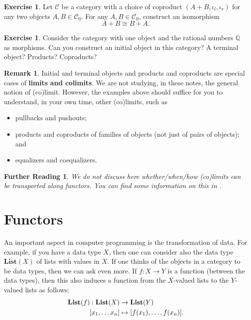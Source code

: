 \documentclass[a4paper,10pt]{scrartcl}
\theoremstyle{plain}
\newtheorem*{reading*}{Further Reading}
\theoremstyle{definition}
\newtheorem{rem}[thm]{Remark}
\newtheorem{exer}[thm]{Exercise}
\newcommand{\Cat}[1]{\mathcal{#1}}
\newcommand{\CC}{\Cat{C}}
\newcommand{\Catb}[1]{\mathbf{#1}}
\newcommand{\List}{\Catb{List}}
\newcommand{\Ob}[1]{{#1}_0}
\newcommand{\inl}{\ensuremath{\iota_l}}
\newcommand{\inr}{\ensuremath{\iota_r}}
\begin{document}
\begin{exer}\label{exer:swap_binary_coproduct}
  Let $\CC$ be a category with a choice of coproduct $(A+ B, \inl, \inr)$ for any two objects $A,B\in \Ob{\CC}$.
  For any $A, B \in \Ob\CC$, construct an isomorphism
  \[ A + B \cong B + A. \]
\end{exer}

\begin{exer}
  Consider the category with one object and the rational numbers $\mathbb{Q}$ as morphisms.
  Can you construct an initial object in this category? A terminal object? Products? Coproducts?
\end{exer}

\begin{rem}
  Initial and terminal objects and products and coproducts are special cases of \textbf{limits and colimits}.
  We are not studying, in these notes, the general notion of (co)limit.
  However, the examples above should suffice for you to understand, in your own time, other (co)limits, such as
  \begin{itemize}
  \item pullbacks and pushouts;
  \item products and coproducts of families of objects (not just of pairs of objects); and
  \item equalizers and coequalizers.
  \end{itemize}
\end{rem}

\begin{reading*}
  We do not discuss here whether/when/how (co)limits can be transported along functors.
  You can find some information on this in \cite[\S 5.3]{leinster}.
\end{reading*}


\section{Functors}\label{sec:functors}
An important aspect in computer programming is the transformation of data. For example, if you have a data type $X$, then one can consider also the data type $\List(X)$ of lists with values in $X$. If one thinks of the objects in a category to be data types, then we can ask even more. If $f:X\to Y$ is a function (between the data types), then this also induces  a function from the $X$-valued lists to the $Y$-valued lists as follows:
\begin{align}\label{eqn:function_on_list}
  \List(f) : \List(X)&\to \List(Y)
  \\
  [x_1,\ldots x_n] &\mapsto [f(x_1),\ldots,f(x_n)]. \notag
\end{align}
\end{document}

